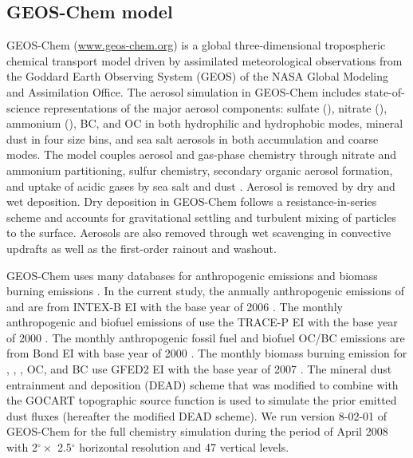 \subsection{GEOS-Chem model} \label{subsec:gc}

GEOS-Chem \citep{Bey01} (\url{www.geos-chem.org}) is a global three-dimensional
tropospheric chemical transport model driven by assimilated meteorological 
observations from the Goddard Earth Observing System (GEOS) of the NASA Global
Modeling and Assimilation Office. The aerosol simulation in GEOS-Chem includes
state-of-science representations of the major aerosol components: sulfate 
(), nitrate (), ammonium (), BC, and OC in both 
hydrophilic and hydrophobic modes, mineral dust in four size bins, and sea 
salt aerosols in both accumulation and coarse modes. The model couples aerosol
and gas-phase chemistry through nitrate and ammonium partitioning, sulfur 
chemistry, secondary organic aerosol formation, and uptake of acidic gases by
sea salt and dust \citep{Park04}. Aerosol is removed by dry and wet 
deposition. Dry deposition in GEOS-Chem follows a resistance-in-series scheme 
\citep{Wesely89} and accounts for gravitational settling \citep{Seinfeld06} 
and turbulent mixing of particles to the surface. Aerosols are
also removed through wet scavenging in convective updrafts as well as the 
first-order rainout and washout.

GEOS-Chem uses many databases for anthropogenic emissions
\citep{vanDonkelaar08} and biomass burning emissions \citep{vanderWerf10}.
In the current study, the annually anthropogenic emissions of  and
 are from INTEX-B EI with the base year of 2006 \citep{Zhang09b}.
The monthly anthropogenic and biofuel emissions of  use the
TRACE-P EI with the base year of 2000 \citep{Streets03}. The monthly 
anthropogenic fossil fuel and biofuel OC/BC emissions are from Bond EI with
base year of 2000 \citep{Bond07}. The monthly biomass burning emission for 
, , , OC, and BC use GFED2 EI with the base year of
2007 \citep{vanderWerf10}. The mineral dust entrainment and deposition (DEAD)
scheme \citep{Zender03a} that was modified to combine with the GOCART 
topographic source function \citep{Ginoux01, Fairlie07} is used to simulate
the prior emitted dust fluxes (hereafter the modified DEAD scheme). We run
version 8-02-01 of GEOS-Chem for the full chemistry simulation during the
period of April 2008 with 2$^\circ \times$ 2.5$^\circ$ horizontal resolution
and 47 vertical levels.


